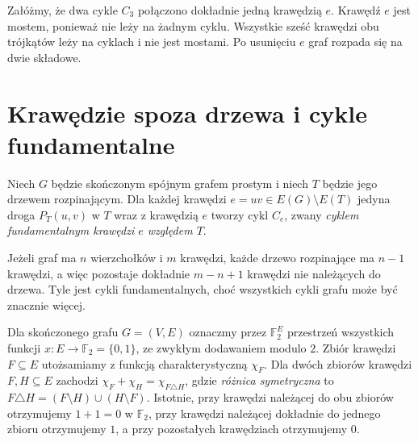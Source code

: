 \begin{przyklad}
Załóżmy, że dwa cykle $C_3$ połączono dokładnie jedną
krawędzią $e$. Krawędź $e$ jest mostem, ponieważ
nie leży na żadnym cyklu. Wszystkie sześć krawędzi
obu trójkątów leży na cyklach i nie jest mostami.
Po usunięciu $e$ graf rozpada się na dwie składowe.
\end{przyklad}

\section{Krawędzie spoza drzewa i cykle fundamentalne}
\label{sec:tg-fundamentalne}

\begin{definicja}
Niech $G$ będzie skończonym spójnym grafem
prostym i niech $T$ będzie jego drzewem
rozpinającym. Dla każdej krawędzi
$e=uv\in E(G)\setminus E(T)$ jedyna droga
$P_T(u,v)$ w $T$ wraz z krawędzią $e$
tworzy cykl $C_e$, zwany \emph{cyklem
fundamentalnym krawędzi $e$ względem $T$}.
\end{definicja}

Jeżeli graf ma $n$ wierzchołków i $m$ krawędzi,
każde drzewo rozpinające ma $n-1$ krawędzi,
a więc pozostaje dokładnie $m-n+1$ krawędzi
nie należących do drzewa. Tyle jest cykli
fundamentalnych, choć wszystkich cykli grafu
może być znacznie więcej.

\begin{center}
\end{center}

\begin{definicja}
Dla skończonego grafu $G=(V,E)$ oznaczmy
przez $\mathbb F_2^E$ przestrzeń wszystkich
funkcji $x:E\to\mathbb F_2=\{0,1\}$, ze
zwykłym dodawaniem modulo $2$.
Zbiór krawędzi $F\subseteq E$ utożsamiamy
z funkcją charakterystyczną $\chi_F$.
Dla dwóch zbiorów krawędzi $F,H\subseteq E$ zachodzi
$\chi_F+\chi_H=\chi_{F\triangle H}$,
gdzie \emph{różnica symetryczna} to
$F\triangle H=(F\setminus H)\cup(H\setminus F)$.
Istotnie, przy krawędzi należącej do obu zbiorów
otrzymujemy $1+1=0$ w $\mathbb F_2$, przy krawędzi
należącej dokładnie do jednego zbioru otrzymujemy $1$,
a przy pozostałych krawędziach otrzymujemy $0$.
\end{definicja}

